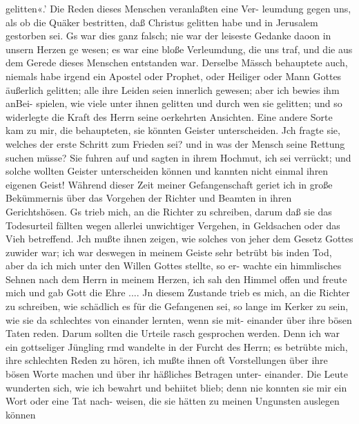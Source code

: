gelitten«.' Die Reden dieses Menschen veranlaßten eine Ver-
leumdung gegen uns, als ob die Quäker bestritten, daß Christus
gelitten habe und in Jerusalem gestorben sei. Gs war dies ganz
falsch; nie war der leiseste Gedanke daoon in unsern Herzen ge
wesen; es war eine bloße Verleumdung, die uns traf, und die
aus dem Gerede dieses Menschen entstanden war. Derselbe
Mässch behauptete auch, niemals habe irgend ein Apostel oder
Prophet, oder Heiliger oder Mann Gottes äußerlich gelitten; alle
ihre Leiden seien innerlich gewesen; aber ich bewies ihm anBei-
spielen, wie viele unter ihnen gelitten und durch wen sie gelitten;
und so widerlegte die Kraft des Herrn seine oerkehrten Ansichten.
Eine andere Sorte kam zu mir, die behaupteten, sie könnten
Geister unterscheiden. Jch fragte sie, welches der erste Schritt
zum Frieden sei? und in was der Mensch seine Rettung suchen
müsse? Sie fuhren auf und sagten in ihrem Hochmut, ich sei
verrückt; und solche wollten Geister unterscheiden können und
kannten nicht einmal ihren eigenen Geist!
Während dieser Zeit meiner Gefangenschaft geriet ich in
große Bekümmernis über das Vorgehen der Richter und Beamten
in ihren Gerichtshösen. Gs trieb mich, an die Richter zu schreiben,
darum daß sie das Todesurteil fällten wegen allerlei unwichtiger
Vergehen, in Geldsachen oder das Vieh betreffend. Jch mußte
ihnen zeigen, wie solches von jeher dem Gesetz Gottes zuwider
war; ich war deswegen in meinem Geiste sehr betrübt bis inden
Tod, aber da ich mich unter den Willen Gottes stellte, so er-
wachte ein himmlisches Sehnen nach dem Herrn in meinem Herzen,
ich sah den Himmel offen und freute mich und gab Gott die
Ehre ....
Jn diesem Zustande trieb es mich, an die Richter zu schreiben,
wie schädlich es für die Gefangenen sei, so lange im Kerker zu
sein, wie sie da schlechtes von einander lernten, wenn sie mit-
einander über ihre bösen Taten reden. Darum sollten die Urteile
rasch gesprochen werden. Denn ich war ein gottseliger Jüngling
rmd wandelte in der Furcht des Herrn; es betrübte mich, ihre
schlechten Reden zu hören, ich mußte ihnen oft Vorstellungen über
ihre bösen Worte machen und über ihr häßliches Betragen unter-
einander. Die Leute wunderten sich, wie ich bewahrt und behiitet
blieb; denn nie konnten sie mir ein Wort oder eine Tat nach-
weisen, die sie hätten zu meinen Ungunsten auslegen können


